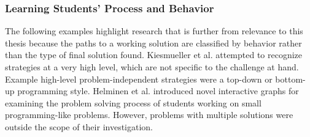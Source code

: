 \documentclass[12pt]{article}
\begin{document}
\subsubsection{Learning Students' Process and Behavior}

The following examples highlight research that is further from relevance to this thesis because the paths to a working solution are classified by behavior rather than the type of final solution found. Kiesmueller et al. \cite{Kiesmueller} attempted to recognize strategies at a very high level, which are not specific to the challenge at hand. Example high-level problem-independent strategies were a top-down or bottom-up programming style. Helminen et al. \cite{ICERHelminen} introduced novel interactive graphs for examining the problem solving process of students working on small programming-like problems. However, problems with multiple solutions were outside the scope of their investigation.



%
%





%
%
%
\end{document}
